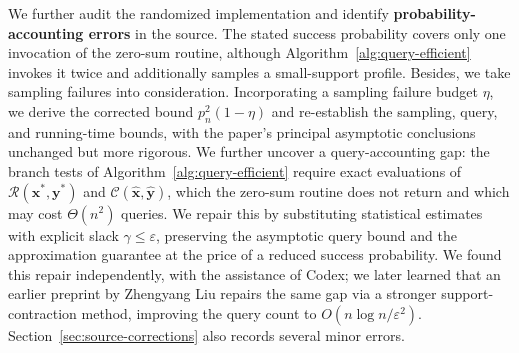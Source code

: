 We further audit the randomized implementation and identify \textbf{probability-accounting errors} in the source. The stated success probability covers only one invocation of the zero-sum routine, although Algorithm~\ref{alg:query-efficient} invokes it twice and additionally samples a small-support profile. Besides, we take sampling failures into consideration. Incorporating a sampling failure budget \(\eta\), we derive the corrected bound \(p_n^2(1-\eta)\) and re-establish the sampling, query, and running-time bounds, with the paper's principal asymptotic conclusions unchanged but more rigorous. We further uncover a query-accounting gap: the branch tests of Algorithm~\ref{alg:query-efficient} require exact evaluations of \(\mathcal{R}(\mathbf{x}^*,\mathbf{y}^*)\) and \(\mathcal{C}(\hat{\mathbf{x}},\hat{\mathbf{y}})\), which the zero-sum routine does not return and which may cost \(\Theta(n^2)\) queries. We repair this by substituting statistical estimates with explicit slack \(\gamma\le\varepsilon\), preserving the asymptotic query bound and the approximation guarantee at the price of a reduced success probability. We found this repair independently, with the assistance of Codex; we later learned that an earlier preprint by Zhengyang Liu \cite{liu2026supportcontractionwellsupportednash} repairs the same gap via a stronger support-contraction method, improving the query count to \(O(n\log n/\varepsilon^2)\). Section~\ref{sec:source-corrections} also records several minor errors.
